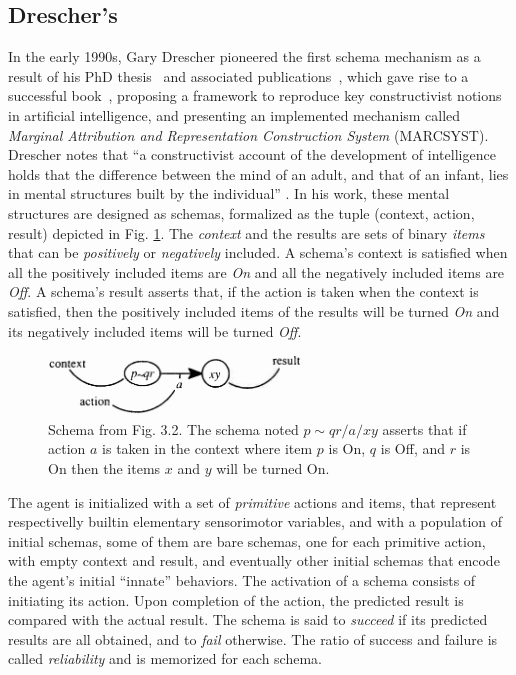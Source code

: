 \documentclass[runningheads]{llncs}
\begin{document}
\subsection{Drescher's}
In the early 1990s, Gary Drescher pioneered the first schema mechanism as a result of his PhD thesis~\cite{Drescher:1989} and associated publications~\cite{Drescher:1987,Drescher:1993}, which gave rise to a successful book~\cite{drescher_made-up_1991}, proposing a framework to reproduce key constructivist notions in artificial intelligence, and presenting an implemented mechanism called \textit{Marginal Attribution and Representation Construction System} (MARCSYST).
Drescher notes that ``a constructivist account of the development of intelligence holds that the difference between the mind of an adult, and that of an infant, lies in mental structures built by the individual'' \cite[p. 41]{drescher_made-up_1991}.
In his work, these mental structures are designed as schemas, formalized as the tuple (context, action, result) depicted in Fig. \ref{fig:drescher}.
The \textit{context} and the results are sets of binary \textit{items} that can be \textit{positively} or \textit{negatively} included. 
A schema's context is satisfied when all the positively included items are \textit{On} and all the negatively included items are \textit{Off}. 
A schema's result asserts that, if the action is taken when the context is satisfied, then the positively included items of the results will be turned \textit{On} and its negatively included items will be turned \textit{Off}.

%
\begin{figure}
	\centering
	\includegraphics[width=0.6\textwidth]{Figure_2_schema_drescher.png}
	\caption{Schema from \cite{drescher_made-up_1991} Fig. 3.2.
		The schema noted $p \!\sim\! qr/a/xy$ asserts that if action $a$ is taken in the context where item $p$ is On, $q$ is Off, and $r$ is On then the items $x$ and $y$ will be turned On.} 
	\label{fig:drescher}
\end{figure}

The agent is initialized with a set of \textit{primitive} actions and items, that represent respectivelly builtin elementary sensorimotor variables, and with a population of initial schemas, some of them are bare schemas, one for each primitive action, with empty context and result, and eventually other initial schemas that encode the agent's initial ``innate'' behaviors. 
The activation of a schema consists of initiating its action. 
Upon completion of the action, the predicted result is compared with the actual result.
The schema is said to \textit{succeed} if its predicted results are all obtained, and to \textit{fail} otherwise. 
The ratio of success and failure is called \textit{reliability} and is memorized for each schema.  
\end{document}
